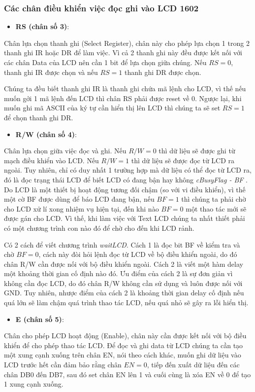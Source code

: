 \subsubsection{Các chân điều khiển việc đọc ghi vào LCD 1602}
\begin{itemize}
    \item \textbf{RS (chân số 3)}:
\end{itemize}
Chân lựa chọn thanh ghi (Select Register), chân này cho phép lựa chọn 1 trong 2 thanh ghi IR hoặc DR để làm việc.
Vì cả 2 thanh ghi này đều được kết nối với các chân Data của LCD nên cần 1 bit để lựa chọn giữa chúng.
Nếu \(RS = 0\), thanh ghi IR được chọn và nếu \(RS = 1\) thanh ghi DR được chọn.

Chúng ta đều biết thanh ghi IR là thanh ghi chứa mã lệnh cho LCD,
vì thế nếu muốn gởi 1 mã lệnh đến LCD thì chân RS phải được reset về 0.
Ngược lại, khi muốn ghi mã ASCII của ký tự cần hiển thị lên LCD thì chúng ta sẽ set \(RS = 1\) để chọn thanh ghi DR.
\begin{itemize}
    \item \textbf{R/W (chân số 4)}:
\end{itemize}
Chân lựa chọn giữa việc đọc và ghi.
Nếu \(R/W = 0\) thì dữ liệu sẽ được ghi từ mạch điều khiển vào LCD.
Nếu \(R/W = 1\) thì dữ liệu sẽ được đọc từ LCD ra ngoài.
Tuy nhiên, chỉ có duy nhất 1 trường hợp mà dữ liệu có thể đọc từ LCD ra,
đó là đọc trạng thái LCD để biết LCD có đang bận hay không \emph{cBusyFlag - BF} .
Do LCD là một thiết bị hoạt động tương đối chậm (so với vi điều khiển),
vì thế một cờ BF được dùng để báo LCD đang bận, nếu \(BF = 1\) thì chúng ta phải chờ cho LCD xử lí xong nhiệm vụ hiện tại,
đến khi nào \(BF = 0\) một thao tác mới sẽ được gán cho LCD.
Vì thế, khi làm việc với Text LCD chúng ta nhất thiết phải có một chương trình con nào đó để chờ cho đến khi LCD rảnh.

Có 2 cách để viết chương trình \emph{waitLCD}.
Cách 1 là đọc bit BF về kiểm tra và chờ \(BF = 0\),
cách này đòi hỏi lệnh đọc từ LCD về bộ điều khiển ngoài, do đó chân R/W cần được nối với bộ điều khiển ngoài.
Cách 2 là viết một hàm delay một khoảng thời gian cố định nào đó. %
Ưu điểm của cách 2 là sự đơn giản vì không cần đọc LCD, do đó chân R/W không cần sử dụng và luôn được nối với GND.
Tuy nhiên, nhược điểm của cách 2 là khoảng thời gian delay cố định nếu quá lớn sẽ làm chậm quá trình thao tác LCD,
nếu quá nhỏ sẽ gây ra lỗi hiển thị.
\begin{itemize}
    \item \textbf{E (chân số 5)}:
\end{itemize}
Chân cho phép LCD hoạt động (Enable), chân này cần được kết nối với bộ điều khiển để cho phép thao tác LCD.
Để đọc và ghi data từ LCD chúng ta cần tạo một xung cạnh xuống trên chân EN,
nói theo cách khác, muốn ghi dữ liệu vào LCD trước hết cần đảm bảo rằng chân \(EN = 0\),
tiếp đến xuất dữ liệu đến các chân DB0 đến DB7, sau đó set chân EN lên 1 và cuối cùng là xóa EN về 0 để tạo 1 xung cạnh xuống.

